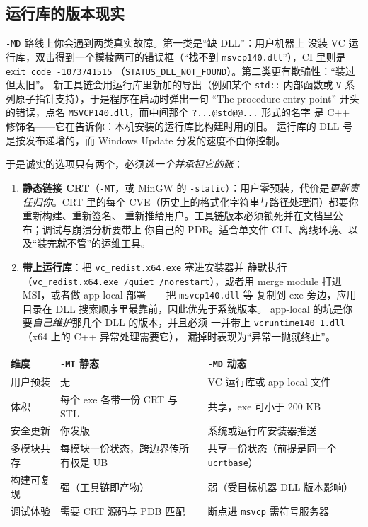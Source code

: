 \documentclass[12pt,a4paper,fontset=fandol]{ctexbook}
\newcommand{\Tp}[1]{\texttt{#1}}
\newcommand{\Short}[1]{\texttt{-#1}}
\newcommand{\Bk}{\allowbreak}
\begin{document}
\subsection{运行库的版本现实}

\Short{MD} 路线上你会遇到两类真实故障。第一类是``缺 DLL''：用户机器上
没装 VC 运行库，双击得到一个模棱两可的错误框（``找不到
\Tp{msvcp140.dll}''），CI 里则是 \Tp{exit code -1073741515}
（\Tp{STATUS\_DLL\_NOT\_FOUND}）。第二类更有欺骗性：``装过但太旧''。
新工具链会用运行库里新加的导出（例如某个 \Tp{std::} 内部函数或
\Tp{V} 系列原子指针支持），于是程序在启动时弹出一句
``The procedure entry point'' 开头的错误，点名
\Tp{MSVCP140.dll}，而中间那个 \Tp{?...@std@@...} 形式的名字
是 C++ 修饰名——它在告诉你：本机安装的运行库比构建时用的旧。
运行库的 DLL 号是按发布递增的，而 Windows Update 分发的速度不由你控制。

于是诚实的选项只有两个，必须\emph{选一个并承担它的账}：

\begin{enumerate}
\item \textbf{静态链接 CRT}（\Short{MT}，或 MinGW 的
\Tp{-static}）：用户零预装，代价是\emph{更新责任归你}。CRT 里的每个
CVE（历史上的格式化字符串与路径处理洞）都要你重新构建、重新签名、
重新推给用户。工具链版本必须锁死并在文档里公布；调试与崩溃分析要带上
你自己的 PDB。适合单文件 CLI、离线环境、以及``装完就不管''的运维工具。
\item \textbf{带上运行库}：把 \Tp{vc\_redist.x64.exe} 塞进安装器并
静默执行（\Tp{vc\_redist\Bk.x64.exe /quiet /norestart}），或者用 merge
module 打进 MSI，或者做 app-local 部署——把 \Tp{msvcp140.dll} 等
复制到 exe 旁边，应用目录在 DLL 搜索顺序里最靠前，因此优先于系统版本。
app-local 的坑是你要\emph{自己维护}那几个 DLL 的版本，并且必须
一并带上 \Tp{vcruntime140\Bk\_1.dll}（x64 上的 C++ 异常处理需要它），
漏掉时表现为``异常一抛就终止''。
\end{enumerate}

\begin{compare}[title={\Tp{/MT} 与 \Tp{/MD} 的实际账目}]
\begin{tabular}{@{}>{\raggedright\arraybackslash}p{}
               >{\raggedright\arraybackslash}p{}
               >{\raggedright\arraybackslash}p{}@{}}
\toprule
维度 & \Short{MT} 静态 & \Short{MD} 动态 \\
\midrule
用户预装 & 无 & VC 运行库或 app-local 文件 \\
体积 & 每个 exe 各带一份 CRT 与 STL & 共享，exe 可小于 200 KB \\
安全更新 & 你发版 & 系统或运行库安装器推送 \\
多模块共存 & 每模块一份状态，跨边界传所有权是 UB &
共享一份状态（前提是同一个 \Tp{ucrtbase}） \\
构建可复现 & 强（工具链即产物） & 弱（受目标机器 DLL 版本影响） \\
调试体验 & 需要 CRT 源码与 PDB 匹配 & 断点进 \Tp{msvcp} 需符号服务器 \\
\bottomrule
\end{tabular}
\end{compare}
\end{document}
